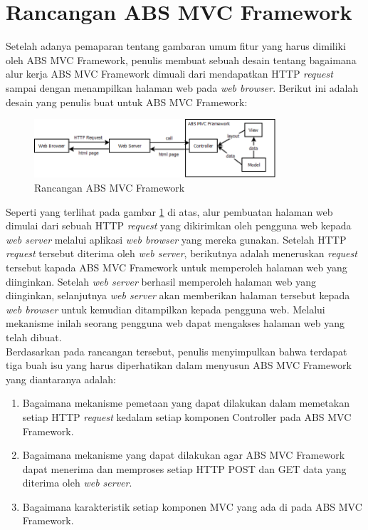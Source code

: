 \section{Rancangan ABS MVC Framework}

Setelah adanya pemaparan tentang gambaran umum fitur yang harus dimiliki oleh ABS MVC Framework, penulis membuat sebuah desain tentang bagaimana alur kerja ABS MVC Framework dimuali dari mendapatkan HTTP \textit{request} sampai dengan menampilkan halaman web pada \textit{web browser}. Berikut ini adalah desain yang penulis buat untuk ABS MVC Framework:

\begin{figure}
    \centering
    \includegraphics[width=0.8\textwidth]{img/abs-mvc.png}
    \caption{Rancangan ABS MVC Framework}
    \label{fig:mvcFrameworkDesign}
\end{figure}

Seperti yang terlihat pada gambar \ref{fig:mvcFrameworkDesign} di atas, alur pembuatan halaman web dimulai dari sebuah HTTP \textit{request} yang dikirimkan oleh pengguna web kepada \textit{web server} melalui aplikasi \textit{web browser} yang mereka gunakan. Setelah HTTP \textit{request} tersebut diterima oleh \textit{web server}, berikutnya adalah meneruskan \textit{request} tersebut kapada ABS MVC Framework untuk memperoleh halaman web yang diinginkan. Setelah \textit{web server} berhasil memperoleh halaman web yang diinginkan, selanjutnya \textit{web server} akan memberikan halaman tersebut kepada \textit{web browser} untuk kemudian ditampilkan kepada pengguna web. Melalui mekanisme inilah seorang pengguna web dapat mengakses halaman web yang telah dibuat.\\

Berdasarkan pada rancangan tersebut, penulis menyimpulkan bahwa terdapat tiga buah isu yang harus diperhatikan dalam menyusun ABS MVC Framework yang diantaranya adalah:

\begin{enumerate}
    \item Bagaimana mekanisme pemetaan yang dapat dilakukan dalam memetakan setiap HTTP \textit{request} kedalam setiap komponen Controller pada ABS MVC Framework.
    \item Bagaimana mekanisme yang dapat dilakukan agar ABS MVC Framework dapat menerima dan memproses setiap HTTP POST dan GET data yang diterima oleh \textit{web server}.
    \item Bagaimana karakteristik setiap komponen MVC yang ada di pada ABS MVC Framework.
\end{enumerate}
